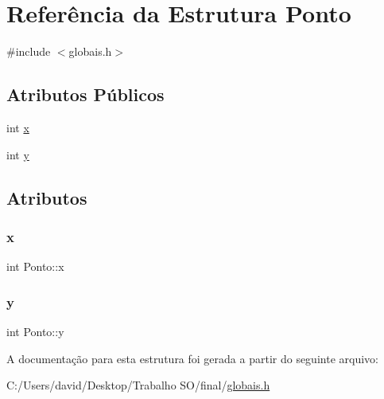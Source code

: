 \hypertarget{struct_ponto}{}\section{Referência da Estrutura Ponto}
\label{struct_ponto}


{\ttfamily \#include $<$globais.\+h$>$}

\subsection*{Atributos Públicos}
\begin{DoxyCompactItemize}
\item 
int \hyperlink{struct_ponto_af1a31a22498a03ae6306f6e25e842095}{x}
\item 
int \hyperlink{struct_ponto_a50c1d80b0bf536d4c29dc5109f4e19b3}{y}
\end{DoxyCompactItemize}


\subsection{Atributos}
\mbox{\label{struct_ponto_af1a31a22498a03ae6306f6e25e842095}} 
\subsubsection{\texorpdfstring{x}{x}}
{\footnotesize\ttfamily int Ponto\+::x}

\mbox{\label{struct_ponto_a50c1d80b0bf536d4c29dc5109f4e19b3}} 
\subsubsection{\texorpdfstring{y}{y}}
{\footnotesize\ttfamily int Ponto\+::y}



A documentação para esta estrutura foi gerada a partir do seguinte arquivo\+:\begin{DoxyCompactItemize}
\item 
C\+:/\+Users/david/\+Desktop/\+Trabalho S\+O/final/\hyperlink{globais_8h}{globais.\+h}\end{DoxyCompactItemize}
